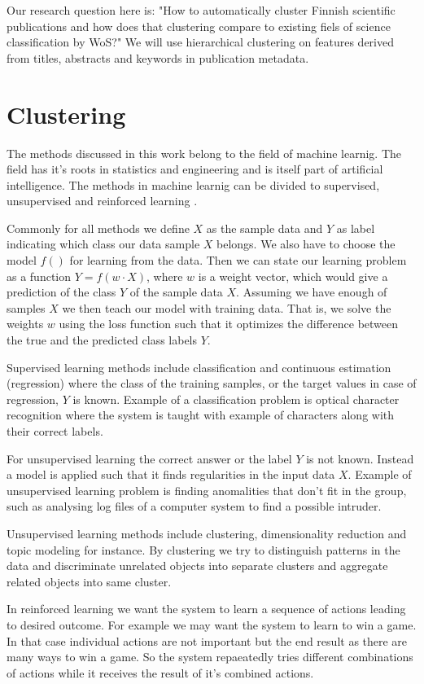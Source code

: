 Our research question here is: "How to automatically cluster 
Finnish scientific publications and how does that clustering 
compare to existing fiels of science classification by WoS?" We 
will use hierarchical clustering on features derived from titles,
abstracts and keywords in publication metadata.


\section{Clustering}
The methods discussed in this work belong to the field of machine 
learnig. The field has it's roots in statistics and engineering 
and is itself part of artificial intelligence.
The methods in machine learnig can be divided to supervised, 
unsupervised and reinforced learning \cite{alpaydin2004introduction}.

Commonly for all methods we define $X$ as
the sample data and $Y$ as label indicating which class our data 
sample $X$ belongs. We also have to choose the model $f()$ for
learning from the data. Then we can state our learning problem as
a function $Y = f(w \cdot X)$, where $w$ is a weight vector, 
which would give a prediction of the class $Y$ of the sample data
$X$. 
Assuming we have enough of samples $X$ we then teach our model 
with training data. That is, we solve the weights $w$ using the
loss function such that it optimizes the difference between the 
true and the predicted class labels $Y$.

Supervised learning methods include classification and continuous 
estimation (regression)
where the class of the training samples, or the target values in 
case of regression, $Y$ is known. Example of a classification 
problem is optical character recognition where the system is 
taught with example of characters along with their correct labels.

For unsupervised learning the correct answer or the label $Y$ is not known. 
Instead a model is applied such that it finds regularities in the
input data $X$. Example of unsupervised learning problem is 
finding anomalities that don't fit in the group, such as analysing
log files of a computer system to find a possible intruder.

Unsupervised learning methods include clustering, dimensionality
reduction and topic modeling for instance. By clustering we try to 
distinguish patterns in the data and discriminate unrelated 
objects into separate clusters and aggregate related objects into
same cluster.

In reinforced learning we want the system to learn a sequence of
actions leading to desired outcome. For example we may want the 
system to learn to win a game. In that case individual actions
are not important but the end result as there are many ways to win
a game. So the system repaeatedly tries different combinations of
actions while it receives the result of it's combined actions.


